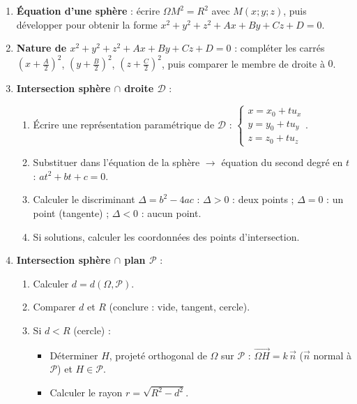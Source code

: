\documentclass[11pt]{article}
\begin{document}
\begin{methode}
\begin{enumerate}
  \item \textbf{Équation d'une sphère} : écrire $\Omega M^2 = R^2$ avec $M(x;y;z)$, puis développer pour obtenir la forme $x^2+y^2+z^2+Ax+By+Cz+D=0$.
  \item \textbf{Nature de $x^2+y^2+z^2+Ax+By+Cz+D=0$} : compléter les carrés $\left(x+\frac{A}{2}\right)^2$, $\left(y+\frac{B}{2}\right)^2$, $\left(z+\frac{C}{2}\right)^2$, puis comparer le membre de droite à $0$.
  \item \textbf{Intersection sphère $\cap$ droite $\mathcal{D}$} :
        \begin{enumerate}
          \item Écrire une représentation paramétrique de $\mathcal{D}$ : $\begin{cases} x = x_0 + t u_x \\ y = y_0 + t u_y \\ z = z_0 + t u_z \end{cases}$.
          \item Substituer dans l'équation de la sphère $\rightarrow$ équation du second degré en $t$ : $at^2+bt+c=0$.
          \item Calculer le discriminant $\Delta = b^2-4ac$ :
                $\Delta > 0$ : deux points ; $\Delta = 0$ : un point (tangente) ; $\Delta < 0$ : aucun point.
          \item Si solutions, calculer les coordonnées des points d'intersection.
        \end{enumerate}
  \item \textbf{Intersection sphère $\cap$ plan $\mathcal{P}$} :
        \begin{enumerate}
          \item Calculer $d = d(\Omega,\mathcal{P})$.
          \item Comparer $d$ et $R$ (conclure : vide, tangent, cercle).
          \item Si $d < R$ (cercle) :
                \begin{itemize}
                  \item Déterminer $H$, projeté orthogonal de $\Omega$ sur $\mathcal{P}$ : $\overrightarrow{\Omega H} = k\,\vec{n}$ ($\vec{n}$ normal à $\mathcal{P}$) et $H \in \mathcal{P}$.
                  \item Calculer le rayon $r = \sqrt{R^2 - d^2}$.
                \end{itemize}

\end{enumerate}
\end{enumerate}
\end{methode}
\end{document}
